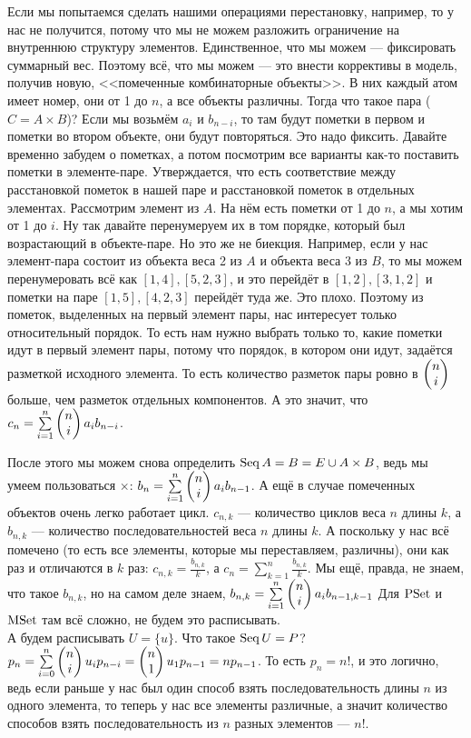 \documentclass{article}
\begin{document}
\begin{itemize}
\begin{Comment}
            Если мы попытаемся сделать нашими операциями перестановку, например, то у нас не получится, потому что мы не можем разложить ограничение на внутреннюю структуру элементов. Единственное, что мы можем --- фиксировать суммарный вес. Поэтому всё, что мы можем --- это внести коррективы в модель, получив новую, <<помеченные комбинаторные объекты>>. В них каждый атом имеет номер, они от 1 до $n$, а все объекты различны. Тогда что такое пара ($C=A\times B$)? Если мы возьмём $a_i$ и $b_{n-i}$, то там будут пометки в первом и пометки во втором объекте, они будут повторяться. Это надо фиксить. Давайте временно забудем о пометках, а потом посмотрим все варианты как-то поставить пометки в элементе-паре. Утверждается, что есть соответствие между расстановкой пометок в нашей паре и расстановкой пометок в отдельных элементах. Рассмотрим элемент из $A$. На нём есть пометки от 1 до $n$, а мы хотим от 1 до $i$. Ну так давайте перенумеруем их в том порядке, который был возрастающий в объекте-паре. Но это же не биекция. Например, если у нас элемент-пара состоит из объекта веса 2 из $A$ и объекта веса 3 из $B$, то мы можем перенумеровать всё как $[1,4],[5,2,3]$, и это перейдёт в $[1,2],[3,1,2]$ и пометки на паре $[1,5],[4,2,3]$ перейдёт туда же. Это плохо. Поэтому из пометок, выделенных на первый элемент пары, нас интересует только относительный порядок. То есть нам нужно выбрать только то, какие пометки идут в первый элемент пары, потому что порядок, в котором они идут, задаётся разметкой исходного элемента. То есть количество разметок пары ровно в $\left(\begin{matrix}n\\i\end{matrix}\right)$ больше, чем разметок отдельных компонентов. А это значит, что $c_n=\sum\limits_{i=1}^n\left(\begin{matrix}n\\i\end{matrix}\right)a_ib_{n-i}$.
        \end{Comment}
        \begin{Comment}
            После этого мы можем снова определить $\operatorname{Seq} A=B=E\cup A\times B$, ведь мы умеем пользоваться $\times$: $b_n=\sum\limits_{i=1}^n\left(\begin{matrix}n\\i\end{matrix}\right)a_ib_{n-1}$. А ещё в случае помеченных объектов очень легко работает цикл. $c_{n,k}$ --- количество циклов веса $n$ длины $k$, а $b_{n,k}$ --- количество последовательностей веса $n$ длины $k$. А поскольку у нас всё помечено (то есть все элементы, которые мы переставляем, различны), они как раз и отличаются в $k$ раз: $c_{n,k}=\frac{b_{n,k}}k$, а $c_n=\sum\limits_{k=1}^n\frac{b_{n,k}}k$. Мы ещё, правда, не знаем, что такое $b_{n,k}$, но на самом деле знаем, $b_{n,k}=\sum\limits_{i=1}^n\left(\begin{matrix}n\\i\end{matrix}\right)a_ib_{n-1,k-1}$ Для $\operatorname{PSet}$ и $\operatorname{MSet}$ там всё сложно, не будем это расписывать.\\
            А будем расписывать $U=\{u\}$. Что такое $\operatorname{Seq} U=P$? $p_n=\sum\limits_{i=0}^n\left(\begin{matrix}n\\i\end{matrix}\right)u_ip_{n-i}=\left(\begin{matrix}n\\1\end{matrix}\right)u_1p_{n-1}=np_{n-1}$. То есть $p_n=n!$, и это логично, ведь если раньше у нас был один способ взять последовательность длины $n$ из одного элемента, то теперь у нас все элементы различные, а значит количество способов взять последовательность из $n$ разных элементов --- $n!$.
        \end{Comment}
    \end{itemize}
\end{document}
